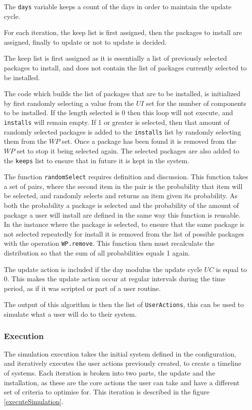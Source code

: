 The \verb+days+ variable keeps a count of the days in order to maintain the update cycle. 

For each iteration, the keep list is first assigned, then the packages to install are assigned, finally to update or not to update is decided.

The keep list is first assigned as it is essentially a list of previously selected packages to install, and does not contain the list of packages currently selected to be installed.

The code which builds the list of packages that are to be installed, is initialized by first randomly selecting a value from the $UI$ set for the number of components to be installed.
If the length selected is 0 then this loop will not execute, and \verb+installs+ will remain empty.
If 1 or greater is selected, then that amount of randomly selected packages is added to the \verb+installs+ list by randomly selecting them from the $WP$ set.
Once a package has been found it is removed from the $WP$ set to stop it being selected again.
The selected packages are also added to the \verb+keeps+ list to ensure that in future it is kept in the system.
 
The function \verb+randomSelect+ requires definition and discussion.
This function takes a set of pairs, where the second item in the pair is the probability that item will be selected,
and randomly selects and returns an item given its probability.
As both the probability a package is selected and the probability of the amount of package a user will install are defined in the same way this function is reusable.
In the instance where the package is selected, to ensure that the same package is not selected repeatedly for install it is removed from the list of possible packages
with the operation \verb+WP.remove+.
This function then must recalculate the distribution so that the sum of all probabilities equals 1 again.

The update action is included if the day modulus the update cycle $UC$ is equal to 0.
This makes the update action occur at regular intervals during the time period, as if it was scripted or part of a user routine.

The output of this algorithm is then the list of \verb+UserActions+, this can be used to simulate what a user will do to their system.

\subsubsection{Execution}
The simulation execution takes the initial system defined in the configuration, and iteratively executes the user actions previously created, to create a timeline of systems.
Each iteration is broken into two parts, the update and the installation, as these are the core actions the user can take and have a different set of criteria to optimise for.
This iteration is described in the figure \ref{executeSimulation}.

